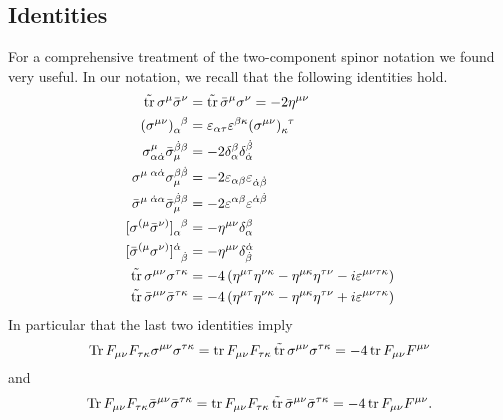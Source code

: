 \subsection{Identities}
For a comprehensive treatment of the two-component spinor notation we found \cite{Dreiner:2008tw} very useful. In our notation, we recall that the following identities hold. 
\begin{align}
\label{identity-1}
\str \sigma^\mu \bar \sigma^\nu
& 	= \str \bar \sigma^\mu \sigma^\nu 
	=
		- 2 \eta^{\mu\nu}
\\
\label{identity-2}
(\sigma^{\mu\nu})\indices{_\alpha^\beta}
&	=
		\varepsilon_{\alpha\tau} \varepsilon^{\beta\kappa} 	
 			( \sigma^{\mu\nu} )\indices{_\kappa^\tau}
\\ 
\label{identity-3}
\sigma^{\mu}_{\alpha\dot\alpha} \bar\sigma^{\dot \beta \beta}_\mu 
&	=
	-	2 \delta_\alpha^\beta\delta^{\dot\beta}_{\dot\alpha}
\\
\label{identity-4}
\sigma^{\mu\; \alpha\dot\alpha} \sigma_\mu^{ \beta \dot \beta}
&	=
	-	2\varepsilon_{\alpha\beta}\varepsilon_{\dot\alpha\dot\beta}
\\
\label{identity-5}
\bar \sigma^{\mu\;\dot \alpha\alpha} \bar\sigma^{\dot \beta \beta}_\mu 
&	=
	-	2\varepsilon^{\alpha\beta}\varepsilon^{\dot\alpha\dot\beta}
\\
\label{identity-6}
[\sigma^{(\mu} \bar\sigma^{\nu)}]\indices{_\alpha^\beta}
&	=
	-	\eta^{\mu\nu} \delta^\beta_\alpha
\\
\label{identity-7}
[\bar \sigma^{(\mu} \sigma^{\nu)}]
	\indices{^{\dot \alpha}_{\dot \beta}}
&	=
	-	\eta^{\mu\nu} \delta^{\dot\alpha}_{\dot\beta}
\\
\label{identity-8}
\str \sigma^{\mu\nu} \sigma^{\tau\kappa}
&	= 
		-4 \left( \eta^{\mu\tau} \eta^{\nu\kappa}
			-	\eta^{\mu\kappa} \eta^{\tau\nu}
			- i \varepsilon^{\mu\nu\tau\kappa}
			\right)
\\
\label{identity-9}
\str \bar \sigma^{\mu\nu} \bar \sigma^{\tau\kappa}
&	= 
		-4 \left( \eta^{\mu\tau} \eta^{\nu\kappa}
			-	\eta^{\mu\kappa} \eta^{\tau\nu}
			+ i \varepsilon^{\mu\nu\tau\kappa}
			\right)
\end{align}
In particular that the last two identities imply
\begin{equation}\label{identity-spinor_trace-double-sigmamn}
\Tr{F_{\mu\nu} F_{\tau\kappa}}
		\sigma\indices{^{\mu \nu}} 
		\sigma\indices{^{\tau \kappa}} 
	=
\tr{F_{\mu\nu} F_{\tau\kappa}}
\str		\sigma\indices{^{\mu \nu}} 
		\sigma\indices{^{\tau \kappa}} 
	=
	- 4 \tr F_{\mu\nu} F^{\mu\nu}
\end{equation}
and
\begin{equation}\label{identity-spinor_trace-double-sigmamn-V}
\Tr{F_{\mu\nu} F_{\tau\kappa}}
		{\bar \sigma}\indices{^{\mu \nu}} 
		{\bar \sigma}\indices{^{\tau \kappa} }
		=
\tr{F_{\mu\nu} F_{\tau\kappa}}
\str	{\bar \sigma}\indices{^{\mu \nu} } 
		{\bar \sigma}\indices{^{\tau \kappa} }
	=
	- 4 \tr F_{\mu\nu} F^{\mu\nu}.
\end{equation}



